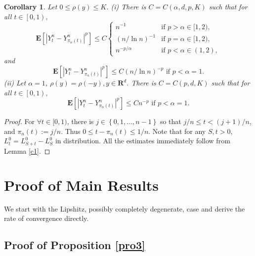 \documentclass[11pt]{amsart}
\theoremstyle{plain}
\newtheorem{corollary}{Corollary}
\numberwithin{equation}{section}
\begin{document}
\begin{corollary}
\label{co2}Let $0\leq \rho \left( y\right) \leq K$.\newline
(i) There is $C=C\left( \alpha ,d,p,K\right) $ such that for all $t\in \left[
0,1\right) ,$\begin{equation*}
\mathbf{E}\left[ \left\vert Y_{t}^{n}-Y_{\pi _{n}\left( t\right)
}^{n}\right\vert ^{p}\right] \leq C\left\{ 
\begin{array}{cc}
n^{-1} & \text{if }p>\alpha \in \lbrack 1,2), \\ 
\left( n/\ln n\right) ^{-1} & \text{if }p=\alpha \in \lbrack 1,2), \\ 
n^{-p/\alpha } & \text{if }p<\alpha \in \left( 1,2\right) ,\end{array}\right.
\end{equation*}and\begin{equation*}
\mathbf{E}\left[ \left\vert Y_{t}^{n}-Y_{\pi _{n}\left( t\right)
}^{n}\right\vert ^{p}\right] \leq C\left( n/\ln n\right) ^{-p}\text{ if }p<\alpha =1.
\end{equation*}(ii) Let $\alpha =1$, $\rho \left( y\right) =\rho \left( -y\right) ,y\in 
\mathbf{R}^{d}$. There is $C=C(p,d,K)$ such that for all $t\in \left[
0,1\right) ,$\begin{equation*}
\mathbf{E}\left[ \left\vert Y_{t}^{n}-Y_{\pi _{n}\left( t\right)
}^{n}\right\vert ^{p}\right] \leq Cn^{-p}\text{ if }p<\alpha =1.
\end{equation*}
\end{corollary}

\begin{proof}
For $\forall t\in \lbrack 0,1)$, there is $j\in \left\{ 0,1,\ldots
,n-1\right\} $ so that $j/n\leq t<(j+1)/n$, and $\pi _{n}\left( t\right)
:=j/n$. Thus $0\leq t-\pi _{n}\left( t\right) \leq 1/n$. Note that for any $S,t>0$, $L_{t}^{0}=L_{S+t}^{0}-L_{S}^{0}$ in distribution. All the estimates
immediately follow from Lemma \ref{c1}.
\end{proof}

\section{Proof of Main Results}

We start with the Lipshitz, possibly completely degenerate, case and derive
the rate of convergence directly.

\subsection{Proof of Proposition \protect\ref{pro3}}
\end{document}

